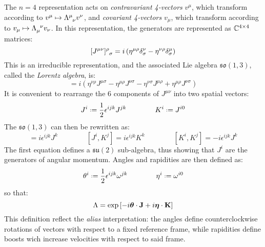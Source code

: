 The $ n = 4 $ representation acts on \textit{contravariant 4-vectors} $ v^\mu $, which transform according to $ v^\mu \mapsto \tensor{\Lambda}{^\mu_\nu} v^\nu $, and \textit{covariant 4-vectors} $ v_\mu $, which transform according to $ v_\mu \mapsto \tensor{\Lambda}{_\mu^\nu} v_\nu $. In this representation, the generators are represented as $ \mathbb{C}^{4 \times 4} $ matrices:
\begin{equation}
  \tensor{[J^{\mu \nu}]}{^\rho_\sigma} = i \left( \eta^{\mu \rho} \delta^\nu_\sigma - \eta^{\nu \rho} \delta^\mu_\sigma \right)
  \label{eq:1.31}
\end{equation}
This is an irreducible representation, and the associated Lie algebra $ \mathfrak{so}(1,3) $, called the \textit{Lorentz algebra}, is:
\begin{equation}
  [J^{\mu \nu}, J^{\sigma \rho}] = i \left( \eta^{\nu \rho} J^{\mu \sigma} - \eta^{\mu \rho} J^{\nu \sigma} - \eta^{\nu \sigma} J^{\mu \rho} + \eta^{\mu \rho} J^{\nu \sigma} \right)
  \label{eq:1.32}
\end{equation}
It is convenient to rearrange the 6 components of $ J^{\mu \nu} $ into two spatial vectors:
\begin{equation}
  J^i \defeq \frac{1}{2} \epsilon^{ijk} J^{jk}
  \qquad \qquad
  K^i \defeq J^{i0}
  \label{eq:1.33}
\end{equation}
The $ \mathfrak{so}(1,3) $ can then be rewritten as:
\begin{equation}
  [J^i, J^j] = i \epsilon^{ijk} J^k
  \qquad \qquad
  [J^i, K^j] = i \epsilon^{ijk} K^k
  \qquad \qquad
  [K^i, K^j] = - i \epsilon^{ijk} J^k
  \label{eq:1.34}
\end{equation}
The first equation defines a $ \mathfrak{su}(2) $ sub-algebra, thus showing that $ J^i $ are the generators of angular momentum. Angles and rapidities are then defined as:
\begin{equation}
  \theta^i \defeq \frac{1}{2} \epsilon^{ijk} \omega^{jk}
  \qquad \qquad
  \eta^i \defeq \omega^{i0}
  \label{eq:1.35}
\end{equation}
so that:
\begin{equation}
  \Lambda = \exp \left[ -i \boldsymbol{\theta} \cdot \mathbf{J} + i \boldsymbol{\eta} \cdot \mathbf{K} \right]
  \label{eq:1.36}
\end{equation}
This definition reflect the \textit{alias} interpretation: the angles define counterclockwise rotations of vectors with respect to a fixed reference frame, while rapidities define boosts wich increase velocities with respect to said frame.

